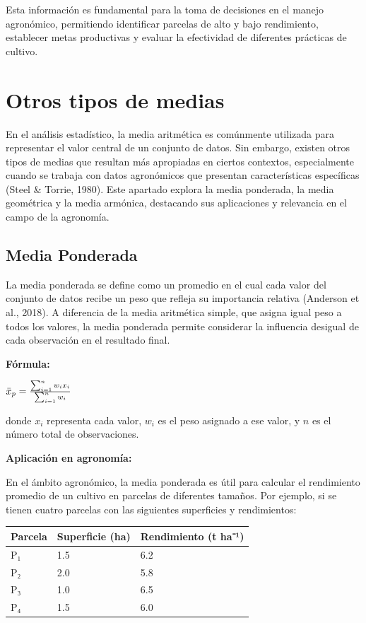 \documentclass[
  spanish,
  letterpaper,
]{book}
\begin{document}
Esta información es fundamental para la toma de decisiones en el manejo
agronómico, permitiendo identificar parcelas de alto y bajo rendimiento,
establecer metas productivas y evaluar la efectividad de diferentes
prácticas de cultivo.


\chapter{Otros tipos de medias}\label{otros-tipos-de-medias}

En el análisis estadístico, la media aritmética es comúnmente utilizada
para representar el valor central de un conjunto de datos. Sin embargo,
existen otros tipos de medias que resultan más apropiadas en ciertos
contextos, especialmente cuando se trabaja con datos agronómicos que
presentan características específicas (Steel \& Torrie, 1980). Este
apartado explora la media ponderada, la media geométrica y la media
armónica, destacando sus aplicaciones y relevancia en el campo de la
agronomía.

\section{Media Ponderada}\label{media-ponderada}

La media ponderada se define como un promedio en el cual cada valor del
conjunto de datos recibe un peso que refleja su importancia relativa
(Anderson et al., 2018). A diferencia de la media aritmética simple, que
asigna igual peso a todos los valores, la media ponderada permite
considerar la influencia desigual de cada observación en el resultado
final.

\textbf{Fórmula:}

\(\Huge\bar{x}_p = \frac{\sum_{i=1}^{n} w_i x_i}{\sum_{i=1}^{n} w_i}\)

donde \(x_i\)\hspace{0pt} representa cada valor, \(w_i\)\hspace{0pt} es
el peso asignado a ese valor, y \(n\) es el número total de
observaciones.

\textbf{Aplicación en agronomía:}

En el ámbito agronómico, la media ponderada es útil para calcular el
rendimiento promedio de un cultivo en parcelas de diferentes tamaños.
Por ejemplo, si se tienen cuatro parcelas con las siguientes superficies
y rendimientos:

\begin{longtable}[]{@{}lll@{}}
\toprule\noalign{}
Parcela & Superficie (ha) & Rendimiento (t ha⁻¹) \\
\midrule\noalign{}
\endhead
\bottomrule\noalign{}
\endlastfoot
P₁ & 1.5 & 6.2 \\
P₂ & 2.0 & 5.8 \\
P₃ & 1.0 & 6.5 \\
P₄ & 1.5 & 6.0 \\
\end{longtable}
\end{document}
